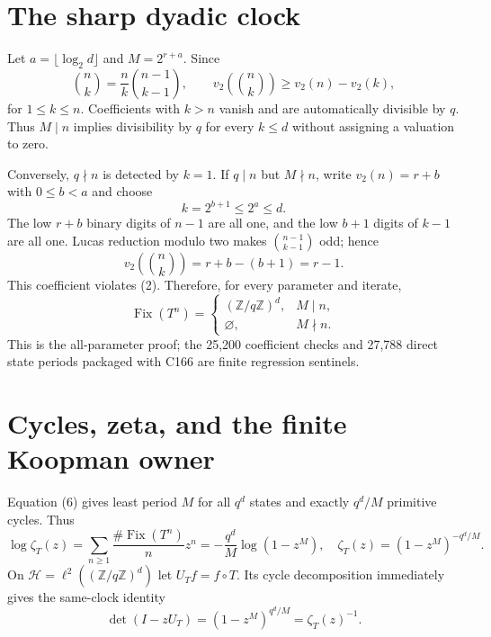 \documentclass[10pt]{article}
\begin{document}
\section{The sharp dyadic clock}
Let $a=\lfloor\log_2d\rfloor$ and $M=2^{r+a}$.  Since
\[
\binom nk=\frac nk\binom{n-1}{k-1},
\qquad v_2\!\left(\binom nk\right)\ge v_2(n)-v_2(k),        \tag{3}
\]
for $1\le k\le n$.  Coefficients with $k>n$ vanish and are automatically
divisible by $q$.  Thus $M\mid n$ implies divisibility by $q$ for every
$k\le d$ without assigning a valuation to zero.

Conversely, $q\nmid n$ is detected by $k=1$.  If $q\mid n$ but $M\nmid n$,
write $v_2(n)=r+b$ with $0\le b<a$ and choose
\[
k=2^{b+1}\le2^a\le d.                                    \tag{4}
\]
The low $r+b$ binary digits of $n-1$ are all one, and the low $b+1$ digits of
$k-1$ are all one.  Lucas reduction modulo two makes
$\binom{n-1}{k-1}$ odd; hence
\[
v_2\!\left(\binom nk\right)=r+b-(b+1)=r-1.                \tag{5}
\]
This coefficient violates (2).  Therefore, for every parameter and iterate,
\[
\operatorname{Fix}(T^n)=
\begin{cases}(\mathbb Z/q\mathbb Z)^d,&M\mid n,\\
\varnothing,&M\nmid n.
\end{cases}                                                \tag{6}
\]
This is the all-parameter proof; the 25,200 coefficient checks and 27,788
direct state periods packaged with C166 are finite regression sentinels.

\section{Cycles, zeta, and the finite Koopman owner}
Equation (6) gives least period $M$ for all $q^d$ states and exactly $q^d/M$
primitive cycles.  Thus
\[
\log\zeta_T(z)=\sum_{n\ge1}\frac{\#\operatorname{Fix}(T^n)}n z^n
=-\frac{q^d}{M}\log(1-z^M),
\quad \zeta_T(z)=(1-z^M)^{-q^d/M}.                         \tag{7}
\]
On $\mathcal H=\ell^2((\mathbb Z/q\mathbb Z)^d)$ let
$U_Tf=f\circ T$.  Its cycle decomposition immediately gives the same-clock
identity
\[
\det(I-zU_T)=(1-z^M)^{q^d/M}=\zeta_T(z)^{-1}.              \tag{8}
\]
\end{document}
